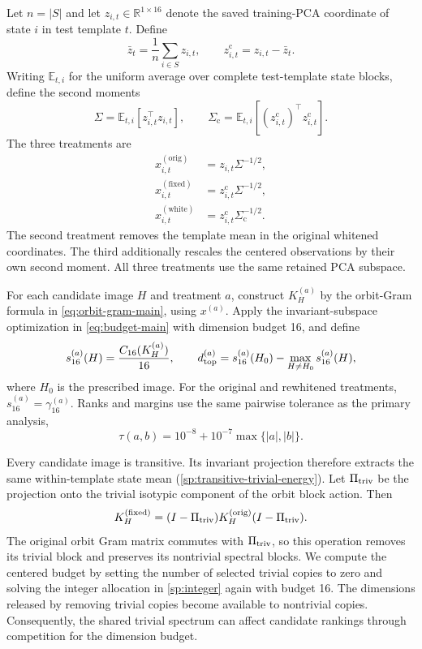Let $n=|S|$ and let $z_{i,t}\in\mathbb R^{1\times16}$
denote the saved training-PCA coordinate of state $i$
in test template $t$.
Define
\[
 \bar z_t=\frac1n\sum_{i\in S}z_{i,t},
 \qquad
 z^{\mathrm c}_{i,t}=z_{i,t}-\bar z_t.
\]
Writing $\mathbb E_{t,i}$ for the uniform average over complete
test-template state blocks, define the second moments
\[
 \Sigma=\mathbb E_{t,i}[z_{i,t}^{\top}z_{i,t}],
 \qquad
 \Sigma_{\mathrm c}
 =\mathbb E_{t,i}[
   (z^{\mathrm c}_{i,t})^{\top}z^{\mathrm c}_{i,t}].
\]
The three treatments are
\begin{align}
 x^{(\mathrm{orig})}_{i,t}
   &=z_{i,t}\Sigma^{-1/2}, \nonumber\\
 x^{(\mathrm{fixed})}_{i,t}
   &=z^{\mathrm c}_{i,t}\Sigma^{-1/2}, \nonumber\\
 x^{(\mathrm{white})}_{i,t}
   &=z^{\mathrm c}_{i,t}\Sigma_{\mathrm c}^{-1/2}.
 \label{eq:template-centering-treatments}
\end{align}
The second treatment removes the template mean in the original
whitened coordinates.
The third additionally rescales the centered observations by
their own second moment.
All three treatments use the same retained PCA subspace.

For each candidate image $H$ and treatment $a$, construct
$K_H^{(a)}$ by the orbit-Gram formula in
\cref{eq:orbit-gram-main}, using $x^{(a)}$.
Apply the invariant-subspace optimization in
\cref{eq:budget-main} with dimension budget 16, and define
\[
 s_{16}^{(a)}(H)
   =\frac{C_{16}(K_H^{(a)})}{16},
 \qquad
 d_{\rm top}^{(a)}
   =s_{16}^{(a)}(H_0)
    -\max_{H\ne H_0}s_{16}^{(a)}(H),
\]
where $H_0$ is the prescribed image.
For the original and rewhitened treatments,
$s_{16}^{(a)}=\gamma_{16}^{(a)}$.
Ranks and margins use the same pairwise tolerance as the
primary analysis,
\[
 \tau(a,b)=10^{-8}+10^{-7}\max\{|a|,|b|\}.
\]

Every candidate image is transitive.
Its invariant projection therefore extracts the same
within-template state mean
(\cref{sp:transitive-trivial-energy}).
Let $\Pi_{\rm triv}$ be the projection onto the trivial
isotypic component of the orbit block action.
Then
\[
 K_H^{(\mathrm{fixed})}
  =(I-\Pi_{\rm triv})K_H^{(\mathrm{orig})}
    (I-\Pi_{\rm triv}).
\]
The original orbit Gram matrix commutes with
$\Pi_{\rm triv}$, so this operation removes its trivial block
and preserves its nontrivial spectral blocks.
We compute the centered budget by setting the number of
selected trivial copies to zero and solving the integer
allocation in \cref{sp:integer} again with budget 16.
The dimensions released by removing trivial copies become
available to nontrivial copies.
Consequently, the shared trivial spectrum can affect candidate
rankings through competition for the dimension budget.

